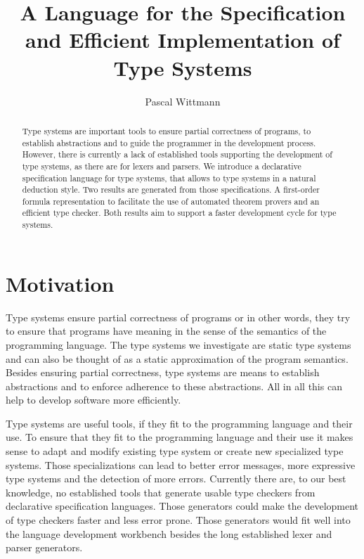\documentclass{acm_proc_article-sp}
\begin{document}
\title{A Language for the Specification and Efficient Implementation
  of Type Systems}


\author{
\alignauthor
Pascal Wittmann
}

\maketitle

\begin{abstract}
  Type systems are important tools to ensure partial correctness of
  programs, to establish abstractions and to guide the programmer in
  the development process. However, there is currently a lack of
  established tools supporting the development of type systems, as
  there are for lexers and parsers. We introduce a declarative
  specification language for type systems, that allows to type systems
  in a natural deduction style. Two results are generated from those
  specifications. A first-order formula representation to facilitate
  the use of automated theorem provers and an efficient type
  checker. Both results aim to support a faster development cycle for
  type systems.
 \end{abstract}

\section{Motivation}
Type systems ensure partial correctness of programs or in other words,
they try to ensure that programs have meaning in the sense of the
semantics of the programming language. The type systems we investigate
are static type systems and can also be thought of as a static
approximation of the program semantics. Besides ensuring partial
correctness, type systems are means to establish abstractions and to
enforce adherence to these abstractions. All in all this can help to
develop software more efficiently. %

Type systems are useful tools, if they fit to the programming language
and their use. To ensure that they fit to the programming language and
their use it makes sense to adapt and modify existing type system or
create new specialized type systems. Those specializations can lead to
better error messages, more expressive type systems and the detection
of more errors. Currently there are, to our best knowledge, no
established tools that generate usable type checkers from declarative
specification languages. Those generators could make the development
of type checkers faster and less error prone. Those generators would
fit well into the language development workbench besides the long
established lexer and parser generators.
\end{document}
